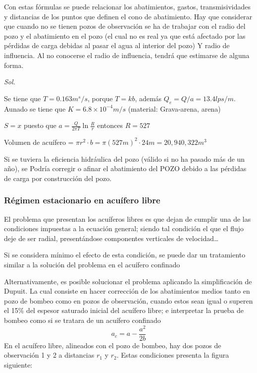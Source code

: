 Con estas fórmulas se puede relacionar los abatimientos, gastos, transmisividades y distancias de los puntos que definen el cono de abatimiento. Hay que considerar que cuando no se tienen pozos de observación se ha de trabajar con el radio del pozo y el abatimiento en el pozo (el cual no es real ya que está afectado por las pérdidas de carga debidas al pasar el agua al interior del pozo) Y radio de influencia. Al no conocerse el radio de influencia, tendrá que estimarse de alguna forma.
\begin{problem}[Datos: b= 24m, gasto de 47lps, $a_p= 3.5m$, $r_p= 10^{\prime\prime}$, $a_1= 0.18m$, $r_1=356m$]
\textit{ Sol. }

Se tiene que $T= 0.163 m^s/s$, porque $T=kb$, además $Q_e=Q/a= 13.4 lps/m$. Aunado se tiene que $K=6.8\times 10^{-4} m/s$ (material: Grava-arena, arena)

$S=x$ puesto que $a= \frac{Q}{2\pi T}\ln{\frac{R}{r}}$ entonces $R=527$
    
Volumen de acuífero = $\pi r^2\cdot b= \pi\left(527m\right)^2\cdot 24m= 20,940,322 m^3$

Si se tuviera la eficiencia hidráulica del pozo (válido si no ha pasado más de un año), se Podría corregir o afinar el abatimiento del POZO debido a las pérdidas de carga por construcción del pozo.
\end{problem}
\subsubsection{Régimen estacionario en acuífero libre}
El problema que presentan los acuíferos libres es que dejan de cumplir una de las condiciones impuestas a la ecuación general; siendo tal condición el que el flujo deje de ser radial, presentándose componentes verticales de velocidad\dots

Si se considera mínimo el efecto de esta condición, se puede dar un tratamiento similar a la solución del problema en el acuífero confinado

Alternativamente, es posible solucionar el problema aplicando la simplificación de Dupuit. La cual consiste en hacer corrección de los abatimientos medios tanto en pozo de bombeo como en pozos de observación, cuando estos sean igual o superen el 15\% del espesor saturado inicial del acuífero libre; e interpretar la prueba de bombeo como si se tratara de un acuífero confinado
\begin{equation}
    a_c = a - \frac{a^2}{2b}
\end{equation}
En el acuífero libre, alineados con el pozo de bombeo, hay dos pozos de observación 1 y 2 a distancias $r_1$ y $r_2$. Estas condiciones presenta la figura siguiente:

